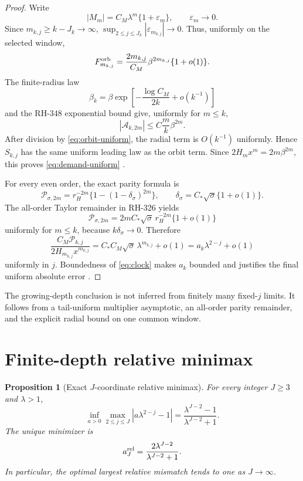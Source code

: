 \documentclass[11pt]{article}
\newtheorem{proposition}[theorem]{Proposition}
\theoremstyle{remark}
\newcommand{\cP}{\mathcal P}
\newcommand{\cA}{\mathcal A}
\begin{document}
\begin{proof}
Write
\[
 |M_m|=C_M\lambda^m\{1+\varepsilon_m\},\qquad
 \varepsilon_m\to0.
\]
Since $m_{k,j}\ge k-J_k\to\infty$,
$\sup_{2\le j\le J_k}|\varepsilon_{m_{k,j}}|\to0$.  Thus, uniformly on
the selected window,
\begin{equation}\label{eq:orbit-uniform}
 F_{m_{k,j}}^{\rm orb}
 =\frac{2m_{k,j}}{C_M}\beta^{2m_{k,j}}\{1+o(1)\}.
\end{equation}
The finite-radius law
\[
 \beta_k=\beta\exp\left[-\frac{\log C_M}{2k}+o(k^{-1})\right]
\]
and the RH-348 exponential bound give, uniformly for $m\le k$,
\[
 |\cA_{k,2m}|\le C\frac{m}{k}\beta^{2m}.
\]
After division by \eqref{eq:orbit-uniform}, the radial term is $O(k^{-1})$
uniformly.  Hence $S_{k,j}$ has the same uniform leading law as the orbit
term.  Since
$2H_mx^m=2m\beta^{2m}$, this proves \eqref{eq:demand-uniform}
\citep{WangBoundaryMonodromy2026,WangLowerLadder2026}.

For every even order, the exact parity formula is
\[
 \cP_{\sigma,2m}
 =r_H^{-2m}\{1-(1-\delta_\sigma)^{2m}\},\qquad
 \delta_\sigma=C_*\sqrt\sigma\{1+o(1)\}.
\]
The all-order Taylor remainder in RH-326 yields
\[
 \cP_{\sigma,2m}
 =2mC_*\sqrt\sigma\,r_H^{-2m}\{1+o(1)\}
\]
uniformly for $m\le k$, because $k\delta_\sigma\to0$.  Therefore
\[
 \frac{C_M\cP_{k,j}}{2H_{m_{k,j}}x^{m_{k,j}}}
 =C_*C_M\sqrt\sigma\,\lambda^{m_{k,j}}+o(1)
 =a_k\lambda^{2-j}+o(1)
\]
uniformly in $j$.  Boundedness of \eqref{eq:clock} makes $a_k$ bounded and
justifies the final uniform absolute error
\citep{WangParityBoundary2026,WangFirstAlias2026}.
\end{proof}

The growing-depth conclusion is not inferred from finitely many fixed-$j$
limits.  It follows from a tail-uniform multiplier asymptotic, an all-order
parity remainder, and the explicit radial bound on one common window.

\section{Finite-depth relative minimax}

\begin{proposition}[Exact $J$-coordinate relative minimax]
\label{prop:relative}
For every integer $J\ge3$ and $\lambda>1$,
\begin{equation}\label{eq:relative}
 \boxed{
 \inf_{a>0}\max_{2\le j\le J}
 |a\lambda^{2-j}-1|
 =\frac{\lambda^{J-2}-1}{\lambda^{J-2}+1}.}
\end{equation}
The unique minimizer is
\begin{equation}\label{eq:relative-optimizer}
 a_J^{\rm rel}=\frac{2\lambda^{J-2}}{\lambda^{J-2}+1}.
\end{equation}
In particular, the optimal largest relative mismatch tends to one as
$J\to\infty$.
\end{proposition}
\end{document}
